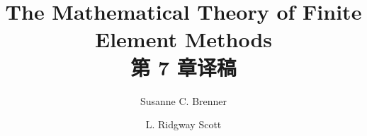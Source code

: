 \documentclass[a4paper,UTF8,12pt]{ctexart}
\title{The Mathematical Theory of Finite Element Methods\\第 7 章译稿}
\author{Susanne C. Brenner \and L. Ridgway Scott}
\date{}
\begin{document}
\maketitle
\setcounter{section}{6}
\renewcommand{\thethmcount}{\thesubsection.\arabic{thmcount}}
\renewcommand{\theequation}{\thesubsection.\arabic{equation}}
\renewcommand{\thefigure}{\thesection.\arabic{figure}}
\renewcommand{\thetable}{\thesection.\arabic{table}}

\end{document}
